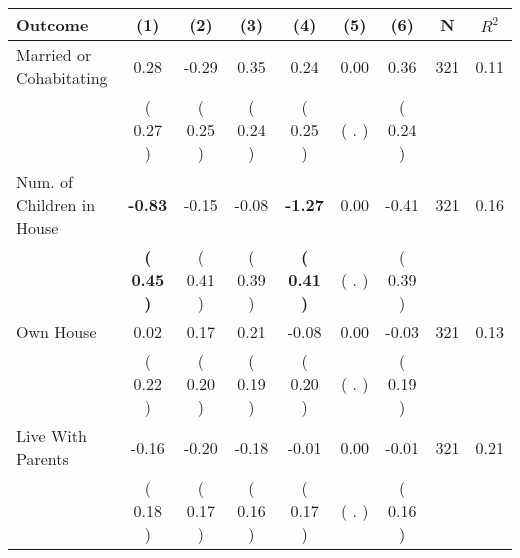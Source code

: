 \begin{tabular}{lcccccccc}
\toprule
 \textbf{Outcome} & \textbf{(1)} & \textbf{(2)} & \textbf{(3)} & \textbf{(4)} & \textbf{(5)} & \textbf{(6)} & \textbf{N} & \textbf{$ R^2$} \\
\midrule
Married or Cohabitating &      0.28 &     -0.29 &      0.35 &      0.24 &      0.00 &      0.36 & 321 &       0.11 \\ 
 & (     0.27 ) & (     0.25 ) & (     0.24 ) & (     0.25 ) & (        . ) & (     0.24 ) & \\
Num. of Children in House & \textbf{    -0.83} &     -0.15 &     -0.08 & \textbf{    -1.27} &      0.00 &     -0.41 & 321 &       0.16 \\ 
 & \textbf{(     0.45 )} & (     0.41 ) & (     0.39 ) & \textbf{(     0.41 )} & (        . ) & (     0.39 ) & \\
Own House &      0.02 &      0.17 &      0.21 &     -0.08 &      0.00 &     -0.03 & 321 &       0.13 \\ 
 & (     0.22 ) & (     0.20 ) & (     0.19 ) & (     0.20 ) & (        . ) & (     0.19 ) & \\
Live With Parents &     -0.16 &     -0.20 &     -0.18 &     -0.01 &      0.00 &     -0.01 & 321 &       0.21 \\ 
 & (     0.18 ) & (     0.17 ) & (     0.16 ) & (     0.17 ) & (        . ) & (     0.16 ) & \\
\bottomrule
\end{tabular}
